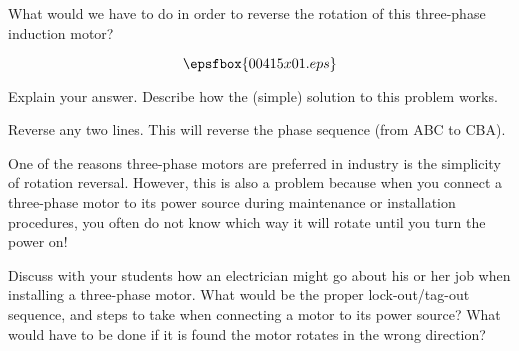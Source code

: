 

What would we have to do in order to reverse the rotation of this three-phase induction motor?

$$\epsfbox{00415x01.eps}$$

Explain your answer.  Describe how the (simple) solution to this problem works.







Reverse any two lines.  This will reverse the phase sequence (from ABC to CBA).







One of the reasons three-phase motors are preferred in industry is the simplicity of rotation reversal.  However, this is also a problem because when you connect a three-phase motor to its power source during maintenance or installation procedures, you often do not know which way it will rotate until you turn the power on!

Discuss with your students how an electrician might go about his or her job when installing a three-phase motor.  What would be the proper lock-out/tag-out sequence, and steps to take when connecting a motor to its power source?  What would have to be done if it is found the motor rotates in the wrong direction?




